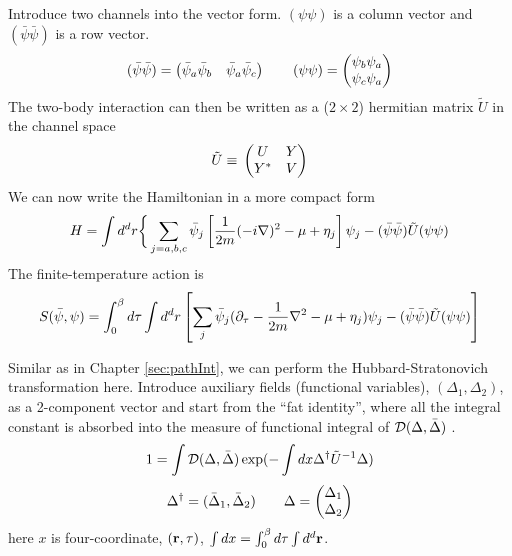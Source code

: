 Introduce two channels into the vector form.    $(\psi\psi)$  is a column vector and $(\bar\psi\bar\psi)$ is a row vector.
\begin{equation*}
(\bar\psi\bar\psi)=\begin{pmatrix}\bar\psi_{a}\bar\psi_{b}&\bar\psi_{a}\bar\psi_{c}\end{pmatrix}
\qquad(\psi\psi)=\begin{pmatrix}\psi_{b}\psi_{a}\\\psi_{c}\psi_{a}\end{pmatrix}
\end{equation*}
The two-body interaction can then be written as a ($2\times2$)  hermitian  matrix  $\tilde{U}$ in the channel space
\begin{equation}
\tilde{U}\equiv{}\begin{pmatrix}U&Y\\Y^{*}&V\end{pmatrix}
\end{equation}
We can now write the Hamiltonian in a more compact form
\begin{equation}
H=\int{d^{d}r}\bigg\{\sum_{j={a,b,c}}\bar\psi_{j}\left[\frac{1}{2m}(-i\nabla)^{2}-\mu+\eta_{j}\right]\psi_{j}
 	-(\bar\psi\bar\psi)\tilde{U}(\psi\psi)
\end{equation}
The finite-temperature action is 
\begin{equation}\label{eq:pathInt2:actionFermi}
S(\bar\psi,\psi)=\int^{\beta}_{0}d\tau\int{d^{d}r}\left[\sum_{j}\bar\psi_{j}(\partial_\tau-\frac{1}{2m}\nabla^{2}-\mu+\eta_{j})\psi_{j}
-(\bar\psi\bar\psi)\tilde{U}(\psi\psi)\right]
\end{equation}



Similar as in Chapter \ref{sec:pathInt}, we can perform the Hubbard-Stratonovich transformation here.   Introduce auxiliary fields (functional variables), $(\Delta_{1},\Delta_{2})$, as a 2-component vector   and start from the ``fat identity'', where  all the integral constant is absorbed into the measure of functional integral of $\mathcal{D}(\Delta,\bar\Delta)$ \cite{Altland}.
\begin{equation}\label{eq:pathInt2:identity}
1=\int{\ensuremath{\mathcal{D}}(\Delta,\bar\Delta)}\exp(-\int{dx}\Delta^{\dagger}\tilde{U}^{-1}\Delta)
\end{equation}
\[
\Delta^{\dagger}=(\bar\Delta_{1},\bar\Delta_{2})\qquad\Delta=\begin{pmatrix}\Delta_{1}\\\Delta_{2}\end{pmatrix}
\]
here $x$ is four-coordinate, $(\mathbf{r}, \tau)$,  $\int{dx}=\int^{\beta}_{0}d\tau\int{d^{d}\ensuremath{\mathbf{r}}}$. 

